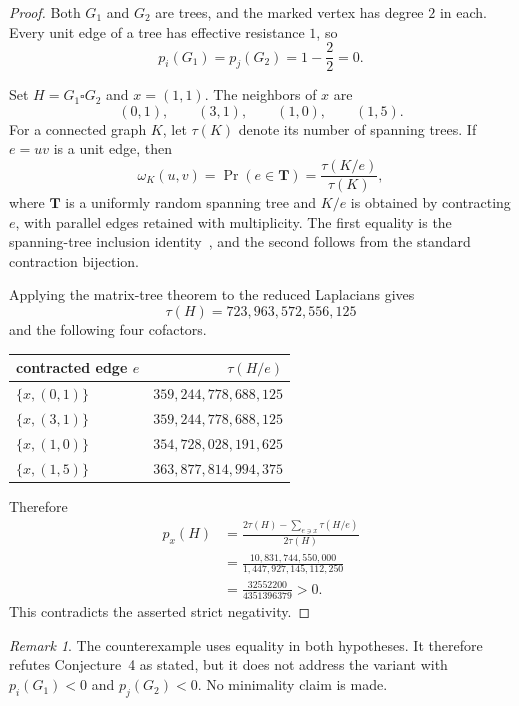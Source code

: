 \documentclass[11pt]{amsart}
\theoremstyle{remark}
\newtheorem*{remark}{Remark}
\begin{document}
\begin{proof}
Both $G_1$ and $G_2$ are trees, and the marked vertex has degree $2$ in
each. Every unit edge of a tree has effective resistance $1$, so
\[
p_i(G_1)=p_j(G_2)=1-\frac22=0.
\]

Set $H=G_1\square G_2$ and $x=(1,1)$. The neighbors of $x$ are
\[
(0,1),\qquad (3,1),\qquad (1,0),\qquad (1,5).
\]
For a connected graph $K$, let $\tau(K)$ denote its number of spanning
trees. If $e=uv$ is a unit edge, then
\[
\omega_K(u,v)=\Pr(e\in\mathbf T)=\frac{\tau(K/e)}{\tau(K)},
\]
where $\mathbf T$ is a uniformly random spanning tree and $K/e$ is
obtained by contracting $e$, with parallel edges retained with
multiplicity. The first equality is the spanning-tree inclusion
identity~\cite[Theorem~2]{DL}, and the second follows from the standard
contraction bijection.

Applying the matrix-tree theorem to the reduced Laplacians gives
\[
\tau(H)=723{,}963{,}572{,}556{,}125
\]
and the following four cofactors.
\begin{center}
\small
\renewcommand{\arraystretch}{1.25}
\begin{tabular}{@{}lr@{}}
\toprule
contracted edge $e$ & $\tau(H/e)$ \\
\midrule
$\{x,(0,1)\}$ & $359{,}244{,}778{,}688{,}125$ \\
$\{x,(3,1)\}$ & $359{,}244{,}778{,}688{,}125$ \\
$\{x,(1,0)\}$ & $354{,}728{,}028{,}191{,}625$ \\
$\{x,(1,5)\}$ & $363{,}877{,}814{,}994{,}375$ \\
\bottomrule
\end{tabular}
\end{center}
Therefore
\[
\begin{aligned}
p_x(H)
&=\frac{2\tau(H)-\sum_{e\ni x}\tau(H/e)}{2\tau(H)}\\
&=\frac{10{,}831{,}744{,}550{,}000}
        {1{,}447{,}927{,}145{,}112{,}250}\\
&=\frac{32552200}{4351396379}>0.
\end{aligned}
\]
This contradicts the asserted strict negativity.
\end{proof}

\begin{remark}
The counterexample uses equality in both hypotheses. It therefore
refutes Conjecture~4 as stated, but it does not address the variant with
$p_i(G_1)<0$ and $p_j(G_2)<0$. No minimality claim is made.
\end{remark}
\end{document}
